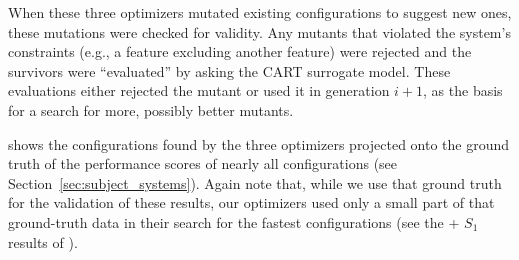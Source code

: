 When these three optimizers mutated existing configurations to suggest new ones,
these mutations were checked for validity. Any mutants that violated the system's constraints (e.g., a feature excluding another feature) were rejected
and the survivors were ``evaluated'' by asking the CART surrogate model.
These evaluations either rejected the mutant or used it in generation $i+1$, as the basis for a search for more, possibly
better  mutants.




 shows the configurations found by the three optimizers projected onto the ground truth of the performance scores of nearly
all configurations (see Section~\ref{sec:subject_systems}). Again note that, while we use that ground truth for the validation of these results, our optimizers 
used only a small part of that ground-truth data in their search for the fastest configurations (see the \what + $S_1$
results of ).


